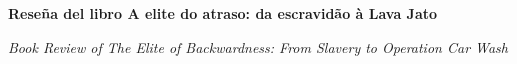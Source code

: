 \documentclass{article}
\renewcommand{\normalsize}{\fontsize{10pt}{13pt}\selectfont}
\newcommand{\articulotipo}{}
\newcommand{\articulotitulo}{}
\newcommand{\articulotitulotrans}{}
\newcommand{\articuloautores}{}
\newcommand{\articulodoi}{}
\newcommand{\articuloidiomaxml}{es}
\newcommand{\articulorevista}{}
\newcommand{\articuloissne}{}
\newcommand{\articulovolumen}{}
\newcommand{\articulonumero}{}
\newcommand{\articulofecha}{}
\begin{document}

\renewcommand{\articuloidiomaxml}{es}
\renewcommand{\articulotitulo}{Reseña del libro A elite do atraso: da escravidão à Lava Jato}
\renewcommand{\articuloautores}{Thiago Almeida Costa}
\renewcommand{\articulodoi}{10.22296/2317-1529.2018v20n3p591}
\renewcommand{\articulotipo}{RESEÑA}
\renewcommand{\articulorevista}{Conexiones: Revista Latinoamericana de Sociedad y Tecnología}
\renewcommand{\articuloissne}{0327-7712}
\renewcommand{\articulovolumen}{01}
\renewcommand{\articulonumero}{01}
\renewcommand{\articulofecha}{ 2026}

\setcounter{page}{1}
\thispagestyle{firstpage}

\noindent\begin{minipage}[t]{\dimexpr\textwidth+\marginparsep+\marginparwidth\relax}%
{\sffamily\bfseries\Large\articulotitulo\par}%
\end{minipage}\par
\vspace{3mm}%
\renewcommand{\articulotitulotrans}{Book Review of The Elite of Backwardness: From Slavery to Operation Car Wash}
\noindent\begin{minipage}[t]{\dimexpr\textwidth+\marginparsep+\marginparwidth\relax}%
{\sffamily\itshape\normalsize\articulotitulotrans\par}%
\end{minipage}\par
\vspace{4mm}%
\end{document}
